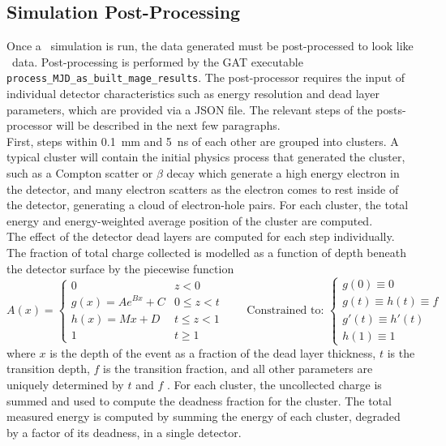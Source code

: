 \documentclass[/main.tex]{subfiles}
\begin{document}
\subsection{Simulation Post-Processing}
Once a \Mage\ simulation is run, the data generated must be post-processed to look like \MJD\ data.
Post-processing is performed by the GAT executable \texttt{process\_MJD\_as\_built\_mage\_results}.
The post-processor requires the input of individual detector characteristics such as energy resolution and dead layer parameters, which are provided via a JSON file.
The relevant steps of the posts-processor will be described in the next few paragraphs.
\\
First, steps within 0.1~mm and 5~ns of each other are grouped into clusters.
A typical cluster will contain the initial physics process that generated the cluster, such as a Compton scatter or $\beta$ decay which generate a high energy electron in the detector, and many electron scatters as the electron comes to rest inside of the detector, generating a cloud of electron-hole pairs.
For each cluster, the total energy and energy-weighted average position of the cluster are computed.
\\
The effect of the detector dead layers are computed for each step individually.
The fraction of total charge collected is modelled as a function of depth beneath the detector surface by the piecewise function
\begin{equation}
  A(x) = \begin{cases}
    0 & z < 0 \\
    g(x)=Ae^{Bx} + C & 0 \leq z < t \\
    h(x)=Mx + D & t \leq z < 1 \\
    1 & t \geq 1
  \end{cases}  \qquad
  \text{Constrained to: } \begin{cases}
    g(0)\equiv 0 \\ g(t)\equiv h(t)\equiv f \\ g'(t)\equiv h'(t) \\ h(1)\equiv 1
  \end{cases}
\end{equation}
where $x$ is the depth of the event as a fraction of the dead layer thickness, $t$ is the transition depth, $f$ is the transition fraction, and all other parameters are uniquely determined by $t$ and $f$ \cite{giovenetti2015phd}\cite{buuck2018}.
For each cluster, the uncollected charge is summed and used to compute the deadness fraction for the cluster.
The total measured energy is computed by summing the energy of each cluster, degraded by a factor of its deadness, in a single detector.
\end{document}
